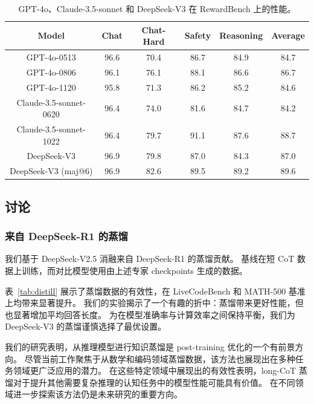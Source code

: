 \documentclass[11pt, a4paper, logo, copyright, nonumbering]{deepseek}
\newcommand{\dsviii}{DeepSeek-V3}
\begin{document}
\begin{table}[t]
    \centering
    \begin{tabular}{c | c c c c c}
    \toprule
    \textbf{Model} & \textbf{Chat} & \textbf{Chat-Hard} & \textbf{Safety} & \textbf{Reasoning} & \textbf{Average} \\
    \midrule
    GPT-4o-0513 & 96.6 & 70.4 & 86.7 & 84.9 & 84.7\\
    GPT-4o-0806 & 96.1 & 76.1 & 88.1 & 86.6 & 86.7\\
    GPT-4o-1120 & 95.8 & 71.3 & 86.2 & 85.2 & 84.6\\
    \midrule 
    Claude-3.5-sonnet-0620 & 96.4 & 74.0 & 81.6 & 84.7 & 84.2\\
    Claude-3.5-sonnet-1022 & 96.4 & 79.7 & 91.1 & 87.6 & 88.7\\
    \midrule 
    \dsviii{} & 96.9 & 79.8 & 87.0 & 84.3 & 87.0\\
    \dsviii{} (maj@6) & 96.9 & 82.6 & 89.5 & 89.2 & 89.6\\
    \bottomrule
    \end{tabular}
    \caption{GPT-4o、Claude-3.5-sonnet 和 \dsviii{} 在 RewardBench 上的性能。}
    \label{tab:rewardbench} 
\end{table}

\subsection{讨论}

\subsubsection{来自 DeepSeek-R1 的蒸馏}

我们基于 DeepSeek-V2.5 消融来自 DeepSeek-R1 的蒸馏贡献。
基线在短 CoT 数据上训练，而对比模型使用由上述专家 checkpoints 生成的数据。

表~\ref{tab:distill} 展示了蒸馏数据的有效性，在 LiveCodeBench 和 MATH-500 基准上均带来显著提升。
我们的实验揭示了一个有趣的折中：蒸馏带来更好性能，但也显著增加平均回答长度。
为在模型准确率与计算效率之间保持平衡，我们为 \dsviii{} 的蒸馏谨慎选择了最优设置。

我们的研究表明，从推理模型进行知识蒸馏是 post-training 优化的一个有前景方向。
尽管当前工作聚焦于从数学和编码领域蒸馏数据，该方法也展现出在多种任务领域更广泛应用的潜力。
在这些特定领域中展现出的有效性表明，long-CoT 蒸馏对于提升其他需要复杂推理的认知任务中的模型性能可能具有价值。
在不同领域进一步探索该方法仍是未来研究的重要方向。
\end{document}
